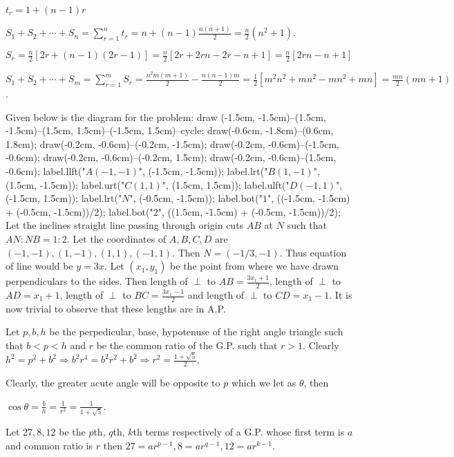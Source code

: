   $t_r = 1 + (n - 1)r$

  $S_1 + S_2 + \cdots + S_n = \displaystyle\sum_{r=1}^nt_r = n + (n - 1)\frac{n(n + 1)}{2} = \frac{n}{2}(n^2
  + 1)$.
\item $S_r = \frac{n}{2}[2r + (n - 1)(2r - 1)] = \frac{n}{2}[2r + 2rn - 2r - n + 1] = \frac{n}{2}[2rn - n +
  1]$

  $S_1 + S_2 + \cdots + S_m = \displaystyle\sum_{r=1}^mS_r = \frac{n^2m(m + 1)}{2} - \frac{n(n - 1)m}{2} =
  \frac{1}{2}[m^2n^2 + mn^2 - mn^2 + mn] = \frac{mn}{2}(mn + 1)$.
\item Given below is the diagram for the problem:
  \startplacefigure[location={left, none}]
    \startMPcode
      draw (-1.5cm, -1.5cm)--(1.5cm, -1.5cm)--(1.5cm, 1.5cm)--(-1.5cm, 1.5cm)--cycle;
      draw(-0.6cm, -1.8cm)--(0.6cm, 1.8cm);
      draw(-0.2cm, -0.6cm)--(-0.2cm, -1.5cm);
      draw(-0.2cm, -0.6cm)--(-1.5cm, -0.6cm);
      draw(-0.2cm, -0.6cm)--(-0.2cm, 1.5cm);
      draw(-0.2cm, -0.6cm)--(1.5cm, -0.6cm);
      label.llft("$A(-1, -1)$", (-1.5cm, -1.5cm));
      label.lrt("$B(1, -1)$", (1.5cm, -1.5cm));
      label.urt("$C(1, 1)$", (1.5cm, 1.5cm));
      label.ulft("$D(-1, 1)$", (-1.5cm, 1.5cm));
      label.lrt("$N$", (-0.5cm, -1.5cm));
      label.bot("$1$", ((-1.5cm, -1.5cm) + (-0.5cm, -1.5cm))/2);
      label.bot("$2$", ((1.5cm, -1.5cm) + (-0.5cm, -1.5cm))/2);
    \stopMPcode
  \stopplacefigure
  Let the inclines straight line passing through origin cuts $AB$ at $N$ such that $AN:NB = 1:2$. Let the
  coordinates of $A, B, C, D$ are $(-1, -1), (1, -1), (1, 1), (-1, 1)$. Then $N = (-1/3, -1)$. Thus equation
  of line would be $y = 3x$. Let $(x_1, y_1)$ be the point from where we have drawn perpendiculars to the
  sides. Then length of $\perp$ to $AB = \frac{3x_1 + 1}{2}$, length of $\perp$ to $AD = x_1 + 1$, length
  of $\perp$ to $BC = \frac{3x_1 - 1}{2}$ and length of $\perp$ to $CD = x_1 - 1$. It is now trivial to
  observe that these lengths are in A.P.
\item Let $p, b, h$ be the perpedicular, base, hypotenuse of the right angle triangle such that $b < p < h$
  and $r$ be the common ratio of the G.P. such that $r > 1$. Clearly $h^2 = p^2 + b^2 \Rightarrow b^2r^4 =
  b^2r^2 + b^2 \Rightarrow r^2 = \frac{1 + \sqrt{5}}{2}$.

  Clearly, the greater acute angle will be opposite to $p$ which we let as $\theta$, then

  $\cos\theta = \frac{b}{h} = \frac{1}{r^2} = \frac{1}{1 + \sqrt{5}}$.
\item Let $27, 8, 12$ be the $p$th, $q$th, $k$th terms respectively of a G.P. whose first term is $a$ and
  common ratio is $r$ then $27 = ar^{p - 1}, 8 = ar^{q - 1}, 12 = ar^{k - 1}$.

